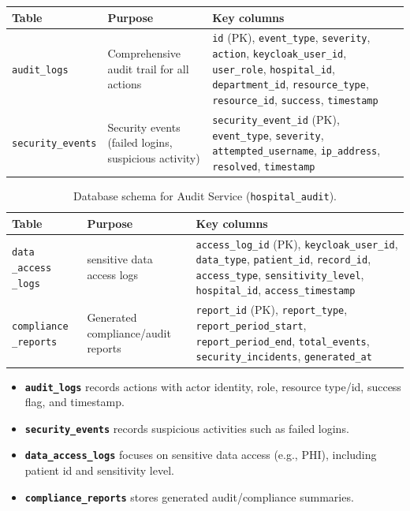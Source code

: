 \begin{table}[ht]
\centering
\renewcommand{\arraystretch}{1.2}
\begin{tabular}{|p{3.2cm}|p{5.6cm}|p{5.6cm}|}
\hline
\textbf{Table} & \textbf{Purpose} & \textbf{Key columns} \\
\hline
\texttt{audit\_logs} &
Comprehensive audit trail for all actions &
\texttt{id} (PK), \texttt{event\_type}, \texttt{severity}, \texttt{action}, \texttt{keycloak\_user\_id}, \texttt{user\_role}, \texttt{hospital\_id}, \texttt{department\_id}, \texttt{resource\_type}, \texttt{resource\_id}, \texttt{success}, \texttt{timestamp} \\
\hline
\texttt{security\_events} &
Security events (failed logins, suspicious activity) &
\texttt{security\_event\_id} (PK), \texttt{event\_type}, \texttt{severity}, \texttt{attempted\_username}, \texttt{ip\_address}, \texttt{resolved}, \texttt{timestamp} \\
\hline
\end{tabular}
\label{tab:db-schema-audit-service}
\end{table}



\begin{table}[H]
\centering
\renewcommand{\arraystretch}{1.2}
\begin{tabular}{|p{3.2cm}|p{5.6cm}|p{5.6cm}|}
\hline
\textbf{Table} & \textbf{Purpose} & \textbf{Key columns} \\
\hline
\texttt{data \_access \_logs} &
sensitive data access logs &
\texttt{access\_log\_id} (PK), \texttt{keycloak\_user\_id}, \texttt{data\_type}, \texttt{patient\_id}, \texttt{record\_id}, \texttt{access\_type}, \texttt{sensitivity\_level}, \texttt{hospital\_id}, \texttt{access\_timestamp} \\
\hline
\texttt{compliance \_reports} &
Generated compliance/audit reports &
\texttt{report\_id} (PK), \texttt{report\_type}, \texttt{report\_period\_start}, \texttt{report\_period\_end}, \texttt{total\_events}, \texttt{security\_incidents}, \texttt{generated\_at} \\
\hline
\end{tabular}
\caption{Database schema for Audit Service (\texttt{hospital\_audit}).}
\label{tab:db-schema-audit-service2}
\end{table}
\begin{itemize}
  \item \textbf{\texttt{audit\_logs}} records actions with actor identity, role, resource type/id, success flag, and timestamp.
  \item \textbf{\texttt{security\_events}} records suspicious activities such as failed logins.
  \item \textbf{\texttt{data\_access\_logs}} focuses on sensitive data access (e.g., PHI), including patient id and sensitivity level.
  \item \textbf{\texttt{compliance\_reports}} stores generated audit/compliance summaries.
\end{itemize}


